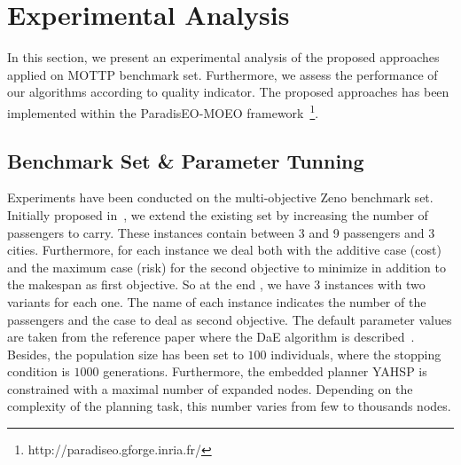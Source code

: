 \documentclass{llncs}
\begin{document}
\section{Experimental Analysis}
\label{sec:experimentalpart}
In this section, we present an experimental analysis of the proposed approaches applied on MOTTP benchmark set. Furthermore, we assess the performance of our algorithms according to quality indicator.
The proposed approaches has been implemented within the ParadisEO-MOEO framework~\footnote{http://paradiseo.gforge.inria.fr/}.%

\subsection{Benchmark Set \&  Parameter Tunning}
Experiments have been conducted  on the  multi-objective Zeno benchmark set. Initially proposed in~\cite{Schoenauer2006}, we extend the existing set by increasing the number of passengers to carry.
These  instances contain between 3 and 9 passengers and 3 cities. 
Furthermore, for each instance we deal both with the additive case (cost)  and the maximum case (risk) for the second objective to minimize in addition to the makespan as first objective.
So at the end , we have 3 instances with two variants for each one.
The name of each instance indicates the number of the passengers and the case  to deal as second objective.
The default parameter values are taken from the reference paper where the DaE algorithm is described~\cite{Bibai2010}.%
Besides, the population size has been set to $100$ individuals, where the stopping condition is $1000$ generations.
Furthermore,  the embedded planner YAHSP  is constrained with a maximal number of expanded nodes. Depending on the complexity of the planning task, this number varies
from few  to thousands nodes.%
\end{document}
